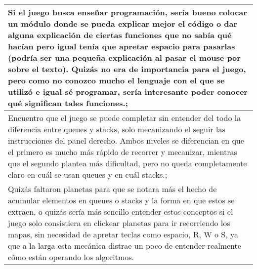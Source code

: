\begin{table}[h]
\begin{tabular}{|p{\linewidth}|}
   Si el juego busca enseñar programación, sería bueno colocar un módulo donde se pueda explicar mejor el código o dar alguna explicación de ciertas funciones que no sabía qué hacían pero igual tenía que apretar espacio para pasarlas (podría ser una pequeña explicación al pasar el mouse por sobre el texto). Quizás no era de importancia para el juego, pero como no conozco mucho el lenguaje con el que se utilizó e igual sé programar, sería interesante poder conocer qué significan tales funciones.; \\ \hline
   Encuentro que el juego se puede completar sin entender del todo la diferencia entre queues y stacks, solo mecanizando el seguir las instrucciones del panel derecho. Ambos niveles se diferencian en que el primero es mucho más rápido de recorrer y mecanizar, mientras que el segundo plantea más dificultad, pero no queda completamente claro en cuál se usan queues y en cuál stacks.; \\ \hline
   Quizás faltaron planetas para que se notara más el hecho de acumular elementos en queues o stacks y la forma en que estos se extraen, o quizás sería más sencillo entender estos conceptos si el juego solo consistiera en clickear planetas para ir recorriendo los mapas, sin necesidad de apretar teclas como espacio, R, W o S, ya que a la larga esta mecánica distrae un poco de entender realmente cómo están operando los algoritmos. \\ \hline
   \end{tabular}
\end{table}

\restoregeometry


